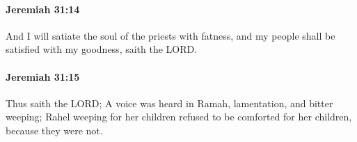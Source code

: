 		\paragraph{Jeremiah 31:14} %
			\label{JEREMIAH-31-14}

			And I will satiate the soul of the priests with fatness, and my people shall be satisfied with my goodness, saith the LORD.


		\paragraph{Jeremiah 31:15} %
			\label{JEREMIAH-31-15}

			Thus saith the LORD; A voice was heard in Ramah, lamentation, and bitter weeping; Rahel weeping for her children refused to be comforted for her children, because they were not.


